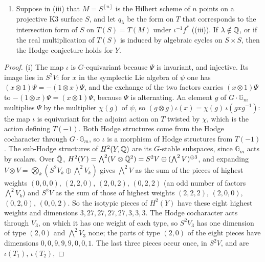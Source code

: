 \begin{proposition}
\begin{enumerate}[label=\textup{(\roman*)},leftmargin=2.6em,itemsep=2pt]
  products of classes in $T(M)$; $f$ is generically finite onto a subvariety
  of dimension eight on which $\sigma_{M}$ is generically nondegenerate;
  $b_{2}(M)\ge10$; and $\dim M\ge10$.
\item Suppose in (iii) that $M=S^{[n]}$ is the Hilbert scheme of $n$ points
  on a projective K3 surface $S$, and
  let $q_{\lambda}$ be the form on $T$ that corresponds to the intersection
  form of $S$ on $T(S)=T(M)$ under $\iota^{-1}f^{*}$
  ((iii)). If $\lambda\notin\mathbb{Q}$, or if the real
  multiplication of $T(S)$ is induced by algebraic cycles on $S\times S$,
  then the Hodge conjecture holds for $Y$.
\end{enumerate}
\end{proposition}

\begin{proof}
(i) The map $\iota$ is $G$-equivariant because $\Psi$ is invariant, and
injective. Its image lies in $S^{2}V$: for $x$ in the symplectic Lie algebra
of $\psi$ one has $(x\otimes1)\Psi=-(1\otimes x)\Psi$, and the exchange of the
two factors carries $(x\otimes1)\Psi$ to $-(1\otimes x)\Psi=(x\otimes1)\Psi$,
because $\Psi$ is alternating. An element $g$ of $G\cdot\mathbb{G}_{m}$
multiplies $\Psi$ by the multiplier $\chi(g)$ of $\psi$, so $(g\otimes g)\iota(x)=
\chi(g)\,\iota(gxg^{-1})$: the map $\iota$ is equivariant for the adjoint
action on $T$ twisted by $\chi$, which is the action defining $T(-1)$. Both
Hodge structures come from the Hodge cocharacter through
$G\cdot\mathbb{G}_{m}$, so $\iota$ is a morphism of Hodge structures from
$T(-1)$. The sub-Hodge structures of $H^{2}(Y,\mathbb{Q})$ are its $G$-stable
subspaces, since $\mathbb{G}_{m}$ acts by scalars. Over $\bar{\mathbb{Q}}$,
$H^{2}(Y)=\bigwedge^{2}(V\otimes\bar{\mathbb{Q}}^{2})=S^{2}V\oplus(\bigwedge^{2}V)^{\oplus3}$,
and expanding $V\otimes V=\bigotimes_{k}(S^{2}V_{k}\oplus\bigwedge^{2}V_{k})$
gives $\bigwedge^{2}V$ as the sum of the pieces of highest weights $(0,0,0)$,
$(2,2,0)$, $(2,0,2)$, $(0,2,2)$ (an odd number of factors $\bigwedge^{2}V_{k}$)
and $S^{2}V$ as the sum of those of highest weights $(2,2,2)$, $(2,0,0)$,
$(0,2,0)$, $(0,0,2)$. So the isotypic pieces of $H^{2}(Y)$ have these eight
highest weights and dimensions $3,27,27,27,27,3,3,3$. The Hodge cocharacter
acts through $V_{3}$, on which it has one weight of each type, so $S^{2}V_{3}$
has one dimension of type $(2,0)$ and $\bigwedge^{2}V_{3}$ none; the parts of
type $(2,0)$ of the eight pieces have dimensions $0,0,9,9,9,0,0,1$. The last
three pieces occur once, in $S^{2}V$, and are $\iota(T_{1})$, $\iota(T_{2})$,

\end{proof}
